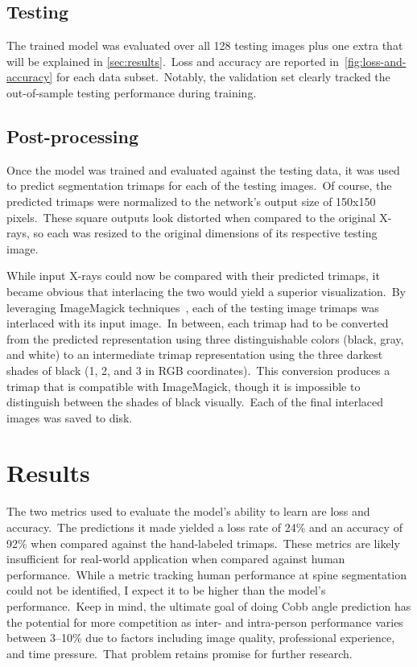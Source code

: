 \documentclass[conference]{IEEEtran}
\begin{document}
    \subsection{Testing}\label{subsec:testing}

    The trained model was evaluated over all 128 testing images plus one extra that will be explained in \autoref{sec:results}.\ Loss and accuracy are reported in~\autoref{fig:loss-and-accuracy} for each data subset.\ Notably, the validation set clearly tracked the out-of-sample testing performance during training.

    \subsection{Post-processing}\label{subsec:post-processing}

    Once the model was trained and evaluated against the testing data, it was used to predict segmentation trimaps for each of the testing images.\ Of course, the predicted trimaps were normalized to the network's output size of 150x150 pixels.\ These square outputs look distorted when compared to the original X-rays, so each was resized to the original dimensions of its respective testing image.

    While input X-rays could now be compared with their predicted trimaps, it became obvious that interlacing the two would yield a superior visualization.\ By leveraging ImageMagick techniques~\cite{image-magick}, each of the testing image trimaps was interlaced with its input image.\ In between, each trimap had to be converted from the predicted representation using three distinguishable colors (black, gray, and white) to an intermediate trimap representation using the three darkest shades of black (1, 2, and 3 in RGB coordinates).\ This conversion produces a trimap that is compatible with ImageMagick, though it is impossible to distinguish between the shades of black visually.\ Each of the final interlaced images was saved to disk.

    \section{Results}\label{sec:results}

    The two metrics used to evaluate the model's ability to learn are loss and accuracy.\ The predictions it made yielded a loss rate of 24\% and an accuracy of 92\% when compared against the hand-labeled trimaps.\ These metrics are likely insufficient for real-world application when compared against human performance.\ While a metric tracking human performance at spine segmentation could not be identified, I expect it to be higher than the model's performance.\ Keep in mind, the ultimate goal of doing Cobb angle prediction has the potential for more competition as inter- and intra-person performance varies between 3--10\%\cite{doi:10.14245/ns.1938426.213} due to factors including image quality, professional experience, and time pressure.\ That problem retains promise for further research.
\end{document}
